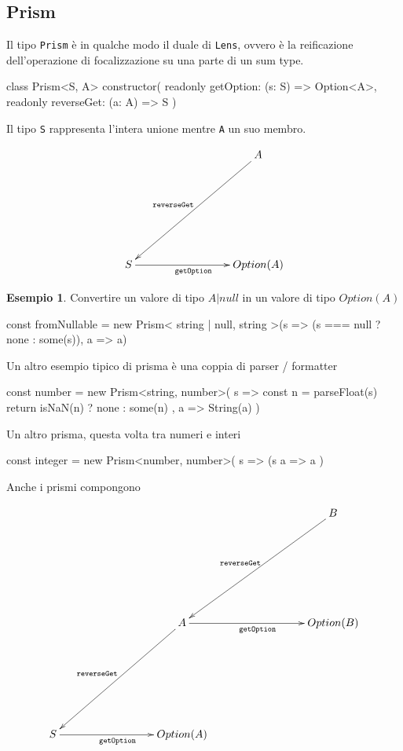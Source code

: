 \documentclass[12pt]{article}
\theoremstyle{definition}
\newtheorem{example}{Esempio}[section]
\newenvironment{code}
  {\vspace{0.5cm} \VerbatimEnvironment\begin{typescriptcode}}
  {\end{typescriptcode} \vspace{0.2cm}}
\begin{document}
\subsection{Prism}

Il tipo \texttt{Prism} è in qualche modo il duale di \texttt{Lens}, ovvero è la reificazione dell'operazione di focalizzazione
su una parte di un sum type.

\begin{code}
class Prism<S, A> {
  constructor(
    readonly getOption: (s: S) => Option<A>,
    readonly reverseGet: (a: A) => S
  ) {}
}
\end{code}

Il tipo \texttt{S} rappresenta l'intera unione mentre \texttt{A} un suo membro.

\[
\xymatrixrowsep{3cm}
\xymatrixcolsep{3cm}
\xymatrix{
  & A \ar[dl]_{\texttt{reverseGet}} \\
  S \ar[r]_{\texttt{getOption}} & {Option(A)}
}
\]

\begin{example}
Convertire un valore di tipo $A | null$ in un valore di tipo $Option(A)$

\begin{code}
const fromNullable = new Prism<
  string | null,
  string
>(s => (s === null ? none : some(s)), a => a)
\end{code}

\end{example}

Un altro esempio tipico di prisma è una coppia di parser / formatter

\begin{code}
const number = new Prism<string, number>(
  s => {
    const n = parseFloat(s)
    return isNaN(n) ? none : some(n)
  },
  a => String(a)
)
\end{code}

Un altro prisma, questa volta tra numeri e interi

\begin{code}
const integer = new Prism<number, number>(
  s => (s %
  a => a
)
\end{code}

Anche i prismi compongono

\[
\xymatrixrowsep{3cm}
\xymatrixcolsep{3cm}
\xymatrix{
  & & B \ar[dl]_{\texttt{reverseGet}} \\
  & A \ar[dl]_{\texttt{reverseGet}} \ar[r]_{\texttt{getOption}} & {Option(B)} \\
  S \ar[r]_{\texttt{getOption}} & {Option(A)}
}
\]
\end{document}
